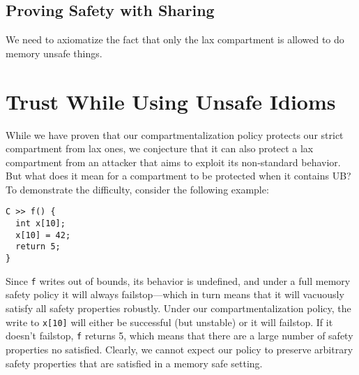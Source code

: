 \documentclass{article}
\begin{document}
\begin{minipage}{0.45\textwidth}
\end{minipage}
\begin{minipage}{0.45\textwidth}
\end{minipage}

\subsection{Proving Safety with Sharing}

We need to axiomatize the fact that only the lax compartment is allowed to
do memory unsafe things.

\section{Trust While Using Unsafe Idioms}

While we have proven that our compartmentalization policy protects our strict
compartment from lax ones, we conjecture that it can also protect a lax compartment
from an attacker that aims to exploit its non-standard behavior. But what does it mean
for a compartment to be protected when it contains UB? To demonstrate the difficulty,
consider the following example:

\begin{verbatim}
C >> f() {
  int x[10];
  x[10] = 42;
  return 5;
}
\end{verbatim}

Since {\tt f} writes out of bounds, its behavior is undefined, and under a full memory safety
policy it will always failstop---which in turn means that it will vacuously satisfy all safety
properties robustly. Under our compartmentalization policy, the write to {\tt x[10]} will either
be successful (but unstable) or it will failstop. If it doesn't failstop, {\tt f} returns 5,
which means that there are a large number of safety properties no satisfied. Clearly,
we cannot expect our policy to preserve arbitrary safety properties that are satisfied in
a memory safe setting.
\end{document}
